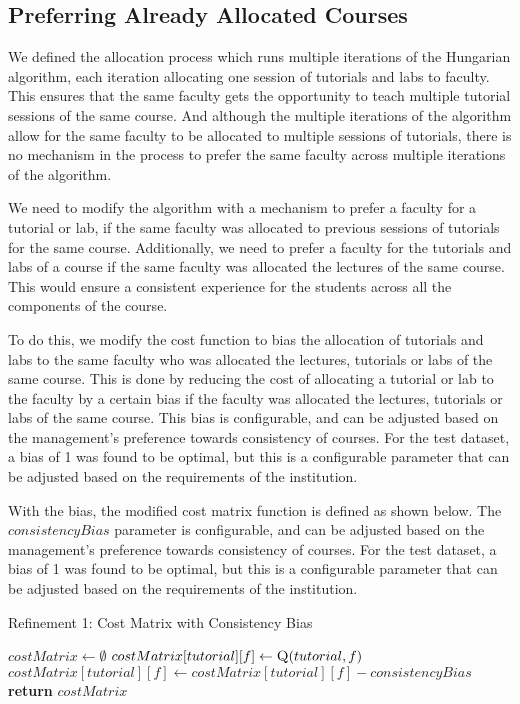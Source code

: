 \subsection{Preferring Already Allocated Courses}

We defined the allocation process which runs multiple iterations of the Hungarian algorithm, each iteration allocating one session of tutorials and labs to faculty. This ensures that the same faculty gets the opportunity to teach multiple tutorial sessions of the same course. And although the multiple iterations of the algorithm allow for the same faculty to be allocated to multiple sessions of tutorials, there is no mechanism in the process to prefer the same faculty across multiple iterations of the algorithm.

We need to modify the algorithm with a mechanism to prefer a faculty for a tutorial or lab, if the same faculty was allocated to previous sessions of tutorials for the same course. Additionally, we need to prefer a faculty for the tutorials and labs of a course if the same faculty was allocated the lectures of the same course. This would ensure a consistent experience for the students across all the components of the course.

To do this, we modify the cost function to bias the allocation of tutorials and labs to the same faculty who was allocated the lectures, tutorials or labs of the same course. This is done by reducing the cost of allocating a tutorial or lab to the faculty by a certain bias if the faculty was allocated the lectures, tutorials or labs of the same course. This bias is configurable, and can be adjusted based on the management's preference towards consistency of courses. For the test dataset, a bias of 1 was found to be optimal, but this is a configurable parameter that can be adjusted based on the requirements of the institution.

With the bias, the modified cost matrix function is defined as shown below. The $consistencyBias$ parameter is configurable, and can be adjusted based on the management's preference towards consistency of courses. For the test dataset, a bias of 1 was found to be optimal, but this is a configurable parameter that can be adjusted based on the requirements of the institution.

\begin{algorithm}[H]
  \caption*{Refinement 1: Cost Matrix with Consistency Bias}
  \begin{algorithmic}
    \State $costMatrix \gets \emptyset$
    \State $costMatrix[tutorial][f] \gets \Call{Q}{tutorial, f}$
    \State $costMatrix[tutorial][f] \gets costMatrix[tutorial][f] - consistencyBias$
    \EndIf
    \EndFor
    \EndFor
    \State \textbf{return} $costMatrix$
    \EndProcedure
  \end{algorithmic}
\end{algorithm}

